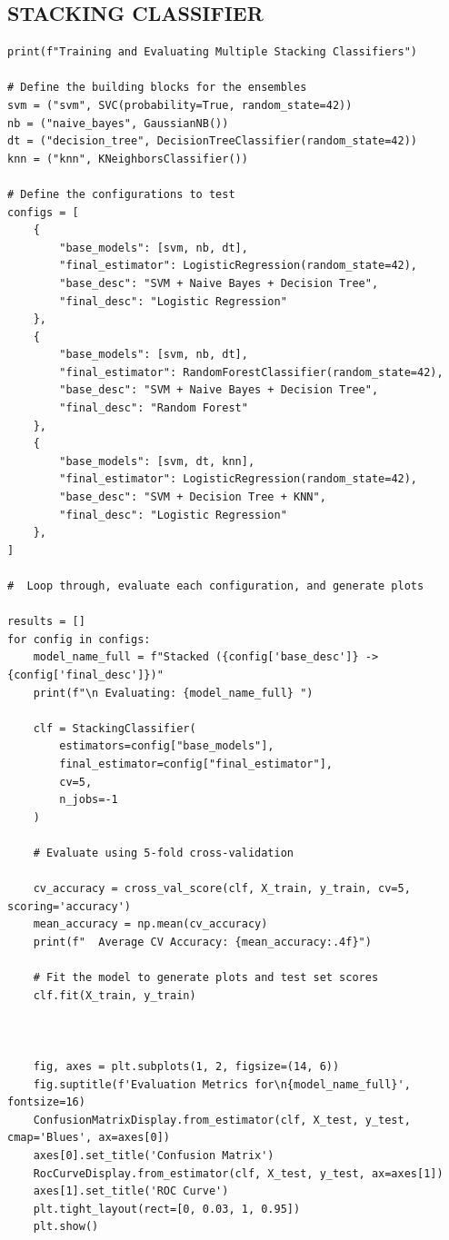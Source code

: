 \documentclass[12pt]{article}
\begin{document}
\subsection*{STACKING CLASSIFIER}
\begin{verbatim}   
print(f"Training and Evaluating Multiple Stacking Classifiers")

# Define the building blocks for the ensembles 
svm = ("svm", SVC(probability=True, random_state=42))
nb = ("naive_bayes", GaussianNB())
dt = ("decision_tree", DecisionTreeClassifier(random_state=42))
knn = ("knn", KNeighborsClassifier())

# Define the configurations to test 
configs = [
    {
        "base_models": [svm, nb, dt],
        "final_estimator": LogisticRegression(random_state=42),
        "base_desc": "SVM + Naive Bayes + Decision Tree",
        "final_desc": "Logistic Regression"
    },
    {
        "base_models": [svm, nb, dt],
        "final_estimator": RandomForestClassifier(random_state=42),
        "base_desc": "SVM + Naive Bayes + Decision Tree",
        "final_desc": "Random Forest"
    },
    {
        "base_models": [svm, dt, knn],
        "final_estimator": LogisticRegression(random_state=42),
        "base_desc": "SVM + Decision Tree + KNN",
        "final_desc": "Logistic Regression"
    },
]

#  Loop through, evaluate each configuration, and generate plots

results = []
for config in configs:
    model_name_full = f"Stacked ({config['base_desc']} -> {config['final_desc']})"
    print(f"\n Evaluating: {model_name_full} ")

    clf = StackingClassifier(
        estimators=config["base_models"],
        final_estimator=config["final_estimator"],
        cv=5,
        n_jobs=-1
    )

    # Evaluate using 5-fold cross-validation
    
    cv_accuracy = cross_val_score(clf, X_train, y_train, cv=5, scoring='accuracy')
    mean_accuracy = np.mean(cv_accuracy)
    print(f"  Average CV Accuracy: {mean_accuracy:.4f}")
    
    # Fit the model to generate plots and test set scores
    clf.fit(X_train, y_train)



    fig, axes = plt.subplots(1, 2, figsize=(14, 6))
    fig.suptitle(f'Evaluation Metrics for\n{model_name_full}', fontsize=16)
    ConfusionMatrixDisplay.from_estimator(clf, X_test, y_test, cmap='Blues', ax=axes[0])
    axes[0].set_title('Confusion Matrix')
    RocCurveDisplay.from_estimator(clf, X_test, y_test, ax=axes[1])
    axes[1].set_title('ROC Curve')
    plt.tight_layout(rect=[0, 0.03, 1, 0.95])
    plt.show()
     

\end{verbatim}
\end{document}
